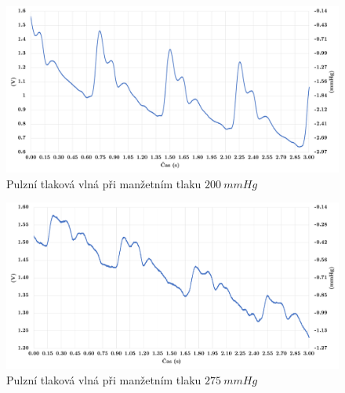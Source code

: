 \pagebreak

\begin{figure}[H]
    \includegraphics[width=1\textwidth]{graphs/pulzace_fabi_200mmhg.png}
    \caption{Pulzní tlaková vlná při manžetním tlaku $200 \ mmHg$}
    \label{fig:pwa_200}
\end{figure}

\begin{figure}[H]
    \includegraphics[width=1\textwidth]{graphs/pulzace_fabi_275mmhg.png}
    \caption{Pulzní tlaková vlná při manžetním tlaku $275 \ mmHg$}
    \label{fig:pwa_275}
\end{figure}
